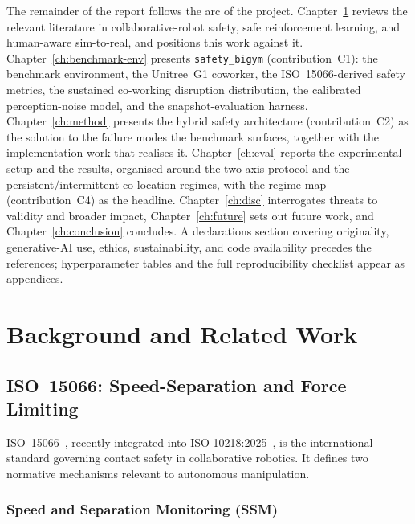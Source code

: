 \documentclass[11pt,a4paper]{report}
\newcommand{\ssm}{SSM}
\newcommand{\iso}{ISO~15066}
\newcommand{\sbigym}{\texttt{safety\_bigym}}
\begin{document}
The remainder of the report follows the arc of the project.
Chapter~\ref{ch:background} reviews the relevant literature in
collaborative-robot safety, safe reinforcement learning, and
human-aware sim-to-real, and positions this work against it.
Chapter~\ref{ch:benchmark-env} presents \sbigym{} (contribution~C1):
the benchmark environment, the Unitree~G1 coworker, the
\iso{}-derived safety metrics, the sustained co-working disruption
distribution, the calibrated perception-noise model, and the
snapshot-evaluation harness. Chapter~\ref{ch:method} presents the
hybrid safety architecture (contribution~C2) as the solution to the
failure modes the benchmark surfaces, together with the
implementation work that realises it. Chapter~\ref{ch:eval} reports
the experimental setup and the results, organised around the two-axis
protocol and the persistent/intermittent co-location regimes, with the
regime map (contribution~C4) as the headline. Chapter~\ref{ch:disc} interrogates
threats to validity and broader impact, Chapter~\ref{ch:future} sets
out future work, and Chapter~\ref{ch:conclusion} concludes. A
declarations section covering originality, generative-AI use, ethics,
sustainability, and code availability precedes the references;
hyperparameter tables and the full reproducibility checklist appear
as appendices.


\chapter{Background and Related Work}
\label{ch:background}

\section{\iso{}: Speed-Separation and Force Limiting}
\label{sec:bg:iso}

\iso{}~\cite{iso15066}, recently integrated into ISO
10218:2025~\cite{iso10218}, is the international standard governing
contact safety in collaborative robotics. It defines two normative
mechanisms relevant to autonomous manipulation.

\subsection{Speed and Separation Monitoring (\ssm{})}
\label{sec:bg:iso:ssm}
\end{document}
